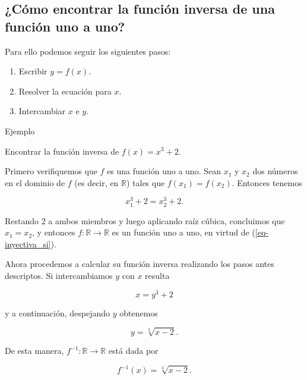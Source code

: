 \documentclass[
  letterpaper,
]{book}
\providecommand{\tightlist}{%
  \setlength{\itemsep}{0pt}\setlength{\parskip}{0pt}}
\theoremstyle{plain}
\theoremstyle{remark}
\begin{document}
\subsection{¿Cómo encontrar la función inversa de una función uno a
uno?}\label{cuxf3mo-encontrar-la-funciuxf3n-inversa-de-una-funciuxf3n-uno-a-uno}

Para ello podemos seguir los siguientes pasos:

\begin{enumerate}
\def\labelenumi{\arabic{enumi}.}
\tightlist
\item
  Escribir \(y=f(x)\).
\item
  Resolver la ecuación para \(x\).
\item
  Intercambiar \(x\) e \(y\).
\end{enumerate}

Ejemplo

Encontrar la función inversa de \(f(x)=x^3+2\).

\begin{tcolorbox}[enhanced jigsaw, opacityback=0, left=2mm, opacitybacktitle=0.6, toprule=.15mm, bottomrule=.15mm, colbacktitle=quarto-callout-tip-color!10!white, titlerule=0mm, bottomtitle=1mm, title=\textcolor{quarto-callout-tip-color}{\faLightbulb}\hspace{0.5em}{Solución}, toptitle=1mm, colframe=quarto-callout-tip-color-frame, colback=white, breakable, rightrule=.15mm, arc=.35mm, leftrule=.75mm, coltitle=black]

Primero verifiquemos que \(f\) es una función uno a uno. Sean \(x_1\) y
\(x_2\) dos números en el dominio de \(f\) (es decir, en \(\mathbb{R}\))
tales que \(f(x_1)=f(x_2)\). Entonces tenemos

\[
x_1^3+2=x_2^3+2.
\]

Restando 2 a ambos miembros y luego aplicando raíz cúbica, concluimos
que \(x_1=x_2\), y entonces \(f\colon \mathbb{R}\to \mathbb{R}\) es un
función uno a uno, en virtud de (\ref{eq-inyectiva_si}).

Ahora procedemos a calcular su función inversa realizando los pasos
antes descriptos. Si intercambiamos \(y\) con \(x\) resulta

\[
x=y^3+2
\]

y a continuación, despejando \(y\) obtenemos

\[
y=\sqrt[3]{x-2}.
\]

De esta manera, \(f^{-1}\colon \mathbb{R}\to \mathbb{R}\) está dada por

\[
f^{-1}(x)=\sqrt[3]{x-2}.
\]

\end{tcolorbox}
\end{document}
